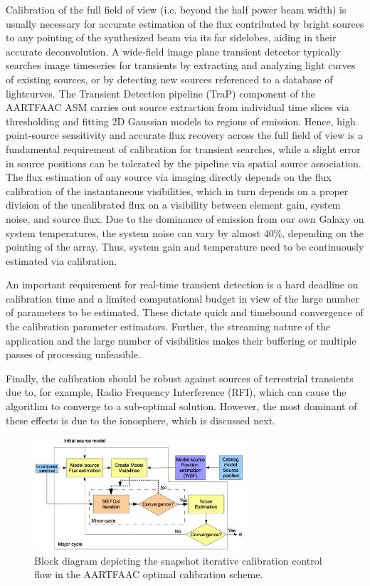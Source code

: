 \documentclass{aa}
\begin{document}
Calibration of the  full field of view (i.e. beyond the  half power beam width)
is usually necessary  for accurate estimation of the  flux contributed by bright
sources to any pointing of the synthesized beam via its far sidelobes, aiding in
their  accurate  deconvolution.  A  wide-field  image  plane transient  detector
typically searches  image timeseries for transients by  extracting and analyzing
light curves  of existing sources, or  by detecting new sources  referenced to a
database   of   lightcurves.     The   Transient   Detection   pipeline   (TraP)
\citep{swinbank2014trap}  component  of  the  AARTFAAC ASM  carries  out  source
extraction  from individual  time slices via  thresholding and  fitting \mbox{2D}
Gaussian models  to regions of  emission.  Hence, high  point-source sensitivity
and  accurate flux  recovery across  the  full field  of view  is a  fundamental
requirement  of calibration  for transient  searches,  while a  slight error  in
source  positions  can   be  tolerated  by  the  pipeline   via  spatial  source
association.  The flux estimation of  any source via imaging directly depends on
the flux calibration of the instantaneous visibilities, which in turn depends on
a proper division of the uncalibrated flux on a visibility between element gain,
system noise,  and source flux.   Due to the  dominance of emission from  our own
Galaxy  on system  temperatures, the  system noise  can vary  by  almost $40\%$,
depending on the pointing of the  array.  Thus, system gain and temperature need
to be continuously estimated via calibration.

An important requirement for real-time transient detection is a hard deadline on
calibration time and a limited computational budget in view of the large number
of parameters to be estimated.  These dictate quick and timebound convergence of
the  calibration parameter  estimators.  Further,  the streaming  nature  of the
application  and the  large  number  of visibilities  makes  their buffering  or
multiple passes of processing unfeasible.

Finally,  the  calibration  should  be  robust against  sources  of  terrestrial
transients due  to, for example,  Radio Frequency Interference (RFI),  which can
cause the  algorithm to converge to  a sub-optimal solution.   However, the most
dominant of these effects is due to the ionosphere, which is discussed next.

\begin{figure}[tbh]
\centering
\includegraphics[width=0.7\textwidth]{Figs/Fig2_blkdiag.png}
\caption{Block diagram depicting the snapshot
iterative calibration control flow in the AARTFAAC optimal calibration
scheme. }
\label{fig:Block-diagram-depicting}
\end{figure}
\end{document}
